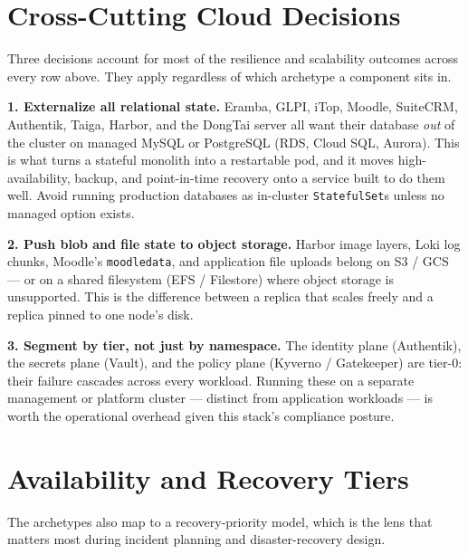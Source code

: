 \documentclass[10pt,letterpaper]{article}
\begin{document}
\section{Cross-Cutting Cloud Decisions}

Three decisions account for most of the resilience and scalability outcomes across every row above. They apply regardless of which archetype a component sits in.

\begin{principlebox}
\textbf{1. Externalize all relational state.} Eramba, GLPI, iTop, Moodle, SuiteCRM, Authentik, Taiga, Harbor, and the DongTai server all want their database \emph{out} of the cluster on managed MySQL or PostgreSQL (RDS, Cloud SQL, Aurora). This is what turns a stateful monolith into a restartable pod, and it moves high-availability, backup, and point-in-time recovery onto a service built to do them well. Avoid running production databases as in-cluster \texttt{StatefulSet}s unless no managed option exists.
\end{principlebox}

\begin{principlebox}
\textbf{2. Push blob and file state to object storage.} Harbor image layers, Loki log chunks, Moodle's \texttt{moodledata}, and application file uploads belong on S3 / GCS --- or on a shared filesystem (EFS / Filestore) where object storage is unsupported. This is the difference between a replica that scales freely and a replica pinned to one node's disk.
\end{principlebox}

\begin{principlebox}
\textbf{3. Segment by tier, not just by namespace.} The identity plane (Authentik), the secrets plane (Vault), and the policy plane (Kyverno / Gatekeeper) are tier-0: their failure cascades across every workload. Running these on a separate management or platform cluster --- distinct from application workloads --- is worth the operational overhead given this stack's compliance posture.
\end{principlebox}

\section{Availability and Recovery Tiers}

The archetypes also map to a recovery-priority model, which is the lens that matters most during incident planning and disaster-recovery design.
\end{document}

